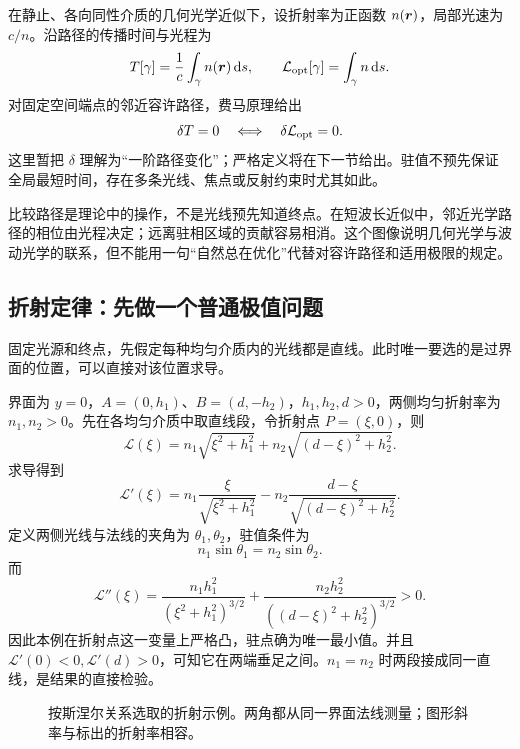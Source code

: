 在静止、各向同性介质的几何光学近似下，设折射率为正函数 $n(\boldsymbol{r})$，局部光速为 $c/n$。沿路径的传播时间与光程为
\begin{equation}\label{eq:fermat}
T[\gamma]=\frac1c\int_\gamma n(\boldsymbol{r})\,\mathrm{d} s,\qquad
\mathcal L_{\rm opt}[\gamma]=\int_\gamma n\,\mathrm{d} s.
\end{equation}
对固定空间端点的邻近容许路径，费马原理给出
\begin{equation}\label{eq:fermat-variation}
\delta T=0\quad\Longleftrightarrow\quad\delta\mathcal L_{\rm opt}=0.
\end{equation}
这里暂把 $\delta$ 理解为“一阶路径变化”；严格定义将在下一节给出。驻值不预先保证全局最短时间，存在多条光线、焦点或反射约束时尤其如此。
\begin{physicsbox}
比较路径是理论中的操作，不是光线预先知道终点。在短波长近似中，邻近光学路径的相位由光程决定；远离驻相区域的贡献容易相消。这个图像说明几何光学与波动光学的联系，但不能用一句“自然总在优化”代替对容许路径和适用极限的规定。
\end{physicsbox}

\subsection{折射定律：先做一个普通极值问题}
固定光源和终点，先假定每种均匀介质内的光线都是直线。此时唯一要选的是过界面的位置，可以直接对该位置求导。

\begin{example}[固定两端的平面折射]
界面为 $y=0$，$A=(0,h_1)$、$B=(d,-h_2)$，$h_1,h_2,d>0$，两侧均匀折射率为 $n_1,n_2>0$。先在各均匀介质中取直线段，令折射点 $P=(\xi,0)$，则
\[
\mathcal L(\xi)=n_1\sqrt{\xi^2+h_1^2}+n_2\sqrt{(d-\xi)^2+h_2^2}.
\]
求导得到
\[
\mathcal L'(\xi)=n_1\frac{\xi}{\sqrt{\xi^2+h_1^2}}
-n_2\frac{d-\xi}{\sqrt{(d-\xi)^2+h_2^2}}.
\]
定义两侧光线与法线的夹角为 $\theta_1,\theta_2$，驻值条件为
\[
\boxed{n_1\sin\theta_1=n_2\sin\theta_2.}
\]
而
\[
\mathcal L''(\xi)=\frac{n_1h_1^2}{(\xi^2+h_1^2)^{3/2}}
+\frac{n_2h_2^2}{((d-\xi)^2+h_2^2)^{3/2}}>0.
\]
因此本例在折射点这一变量上严格凸，驻点确为唯一最小值。并且 $\mathcal L'(0)<0,\mathcal L'(d)>0$，可知它在两端垂足之间。$n_1=n_2$ 时两段接成同一直线，是结果的直接检验。
\end{example}
\begin{figure}[htbp]
\centering
{}
\caption{按斯涅尔关系选取的折射示例。两角都从同一界面法线测量；图形斜率与标出的折射率相容。}
\label{fig:var-refraction}
\end{figure}

